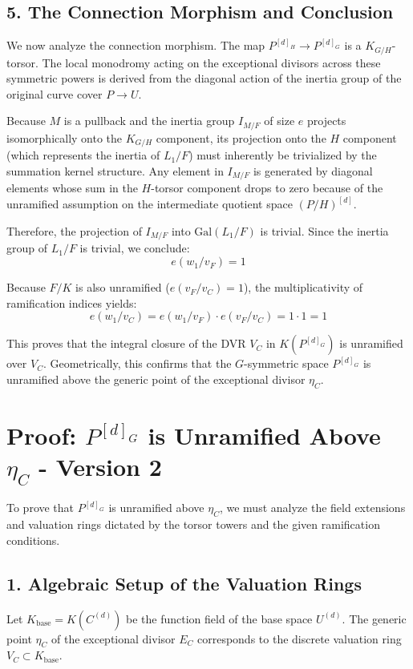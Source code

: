 \subsection*{5. The Connection Morphism and Conclusion}

We now analyze the connection morphism. The map $P^{[d]_H} \to P^{[d]_G}$ is a $K_{G/H}$-torsor. The local monodromy acting on the exceptional divisors across these symmetric powers is derived from the diagonal action of the inertia group of the original curve cover $P \to U$. 

Because $M$ is a pullback and the inertia group $I_{M/F}$ of size $e$ projects isomorphically onto the $K_{G/H}$ component, its projection onto the $H$ component (which represents the inertia of $L_1/F$) must inherently be trivialized by the summation kernel structure. Any element in $I_{M/F}$ is generated by diagonal elements whose sum in the $H$-torsor component drops to zero because of the unramified assumption on the intermediate quotient space $(P/H)^{[d]}$. 

Therefore, the projection of $I_{M/F}$ into $\text{Gal}(L_1/F)$ is trivial. Since the inertia group of $L_1/F$ is trivial, we conclude:
\[
e(w_1 / v_F) = 1
\]

Because $F/K$ is also unramified ($e(v_F / v_C) = 1$), the multiplicativity of ramification indices yields:
\[
e(w_1 / v_C) = e(w_1 / v_F) \cdot e(v_F / v_C) = 1 \cdot 1 = 1
\]

This proves that the integral closure of the DVR $V_C$ in $K(P^{[d]_G})$ is unramified over $V_C$. Geometrically, this confirms that the $G$-symmetric space $P^{[d]_G}$ is unramified above the generic point of the exceptional divisor $\eta_C$.

\section*{Proof: $P^{[d]_G}$ is Unramified Above $\eta_C$ - Version 2}

To prove that $P^{[d]_G}$ is unramified above $\eta_C$, we must analyze the field extensions and valuation rings dictated by the torsor towers and the given ramification conditions.

\subsection*{1. Algebraic Setup of the Valuation Rings}

Let $K_{\text{base}} = K(C^{(d)})$ be the function field of the base space $U^{(d)}$. The generic point $\eta_C$ of the exceptional divisor $E_C$ corresponds to the discrete valuation ring $V_C \subset K_{\text{base}}$. 

